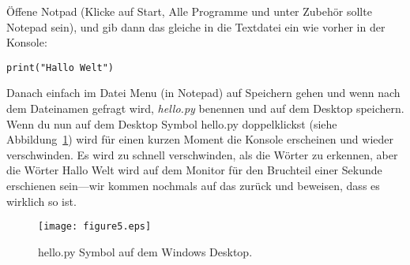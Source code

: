 \begin{WINDOWS}
Öffene Notpad (Klicke auf Start, Alle Programme und unter Zubehör sollte Notepad sein), und gib dann das gleiche in die Textdatei ein wie vorher in der Konsole:

\begin{listing}
\begin{verbatim}
print("Hallo Welt")
\end{verbatim}
\end{listing}

Danach einfach im Datei Menu (in Notepad) auf Speichern gehen und wenn nach dem Dateinamen gefragt wird, \emph{hello.py} benennen und auf dem Desktop speichern. Wenn du nun auf dem Desktop Symbol hello.py doppelklickst (siehe Abbildung~\ref{fig5}) wird für einen kurzen Moment die Konsole erscheinen und wieder verschwinden. Es wird zu schnell verschwinden, als die Wörter zu erkennen, aber die Wörter Hallo Welt wird auf dem Monitor für den Bruchteil einer Sekunde erschienen sein---wir kommen nochmals auf das zurück und beweisen, dass es wirklich so ist.\\

\begin{figure}
\begin{center}
\texttt{[image: figure5.eps]}
\end{center}
\caption{hello.py Symbol auf dem Windows Desktop.}\label{fig5}
\end{figure}
\end{WINDOWS}

